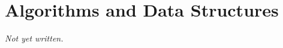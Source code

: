 \chapter{Algorithms and Data Structures}\label{ch:algorithms-data-structures}


\textit{Not yet written.}
